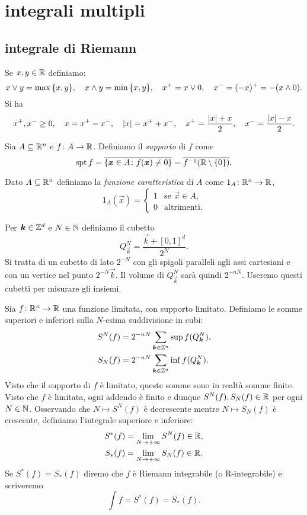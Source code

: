 \chapter{integrali multipli}

\section{integrale di Riemann}
Se $x,y\in {\mathbb R}$ definiamo:
\[
    x \vee y = \max{\left\{ x,y \right\}},
    \quad
    x \wedge y = \min{\left\{ x,y \right\}},
    \quad
    x^+ = x \vee 0,
    \quad
    x^- = (-x)^+ = -(x\wedge 0).
\]
Si ha
\[
    x^+,x^-\ge 0,
    \quad
    x = x^+ - x^-,
    \quad 
    {\left|x\right|} = x^+ + x^-,
    \quad
    x^+ = \frac{{\left|x\right|}+x}{2},
    \quad
    x^- = \frac{{\left|x\right|}-x}{2}.
\]

Sia $A\subseteq {\mathbb R}^n$ e $f\colon A \to {\mathbb R}$. 
Definiamo il \emph{supporto} di $f$ come 
\[
 \operatorname{spt} f 
    = \overline{{\left\{ \boldsymbol x \in A \colon f(\boldsymbol x) \neq 0 \right\}}}
    = \overline{f^{-1}({\mathbb R}\setminus{\left\{ 0 \right\}})}.
\]

Dato $A\subseteq {\mathbb R}^n$ definiamo la \emph{funzione caratteristica}
di $A$ come $1_A\colon {\mathbb R}^n \to {\mathbb R}$,
\[
  1_A(\vec x) = \begin{cases}
    1 & \text{se $\vec x \in A$,}\\
    0 & \text{altrimenti.}
  \end{cases}
\]

Per $\boldsymbol k \in {\mathbb Z}^d$ e $N\in {\mathbb N}$ definiamo 
il cubetto 
\[
  Q^N_{\vec k} = \frac{\vec k + [0,1]^d}{2^N}.
\]
Si tratta di un cubetto di lato $2^{-N}$ con gli spigoli paralleli 
agli assi cartesiani e con un vertice nel punto $2^{-N} \vec k$.
Il volume di $Q^N_{\vec k}$ sarà quindi $2^{-nN}$.
Useremo questi cubetti per misurare gli insiemi.

\begin{definition}
  \label{def:integrale_riemann}
Sia $f\colon {\mathbb R}^n \to {\mathbb R}$ una funzione limitata, 
con supporto limitato.
Definiamo le somme superiori e inferiori sulla $N$-esima suddivisione in cubi:
\begin{align*}
    S^N(f) &= 2^{-nN}\sum_{\boldsymbol k\in {\mathbb Z}^n} \sup f(Q^N_{\boldsymbol k}), \\
    S_N(f) &= 2^{-nN}\sum_{\boldsymbol k\in {\mathbb Z}^n} \inf f(Q^N_{\boldsymbol k}).
\end{align*}
Visto che il supporto di $f$ è limitato, queste somme sono in realtà 
somme finite. Visto che $f$ è limitata, ogni addendo è finito e dunque 
$S^N(f), S_N(f) \in {\mathbb R}$ per ogni $N\in {\mathbb N}$.
Osservando che $N\mapsto S^N(f)$ è decrescente 
mentre $N\mapsto S_N(f)$ è crescente, definiamo
l'integrale superiore e inferiore:
\begin{align*}
    S^*(f) &= \lim_{N\to +\infty} S^N(f) \in {\mathbb R}, \\
    S_*(f) &= \lim_{N\to +\infty} S_N(f) \in {\mathbb R}.
\end{align*}
Se $S^*(f)=S_*(f)$ diremo che $f$ è Riemann integrabile (o R-integrabile)
e scriveremo
\[
  \int f = S^*(f) = S_*(f).
\]
\end{definition}

